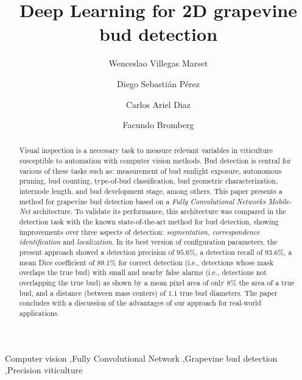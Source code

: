 \documentclass[a4paper,authoryear,review]{elsarticle}
\begin{document}
\begin{frontmatter}

\title{Deep Learning for 2D grapevine bud detection}

\author[utn]{Wenceslao Villegas Marset}

\author[utn]{Diego Sebastián Pérez}

\author[utn]{Carlos Ariel Diaz}

\author[utn,conicet]{Facundo Bromberg}

\address[utn]{Universidad Tecnológica Nacional, Facultad Regional Mendoza, Grupo de Inteligencia Artificial DHARMa, Dpto. de Sistemas de la Información. Rodríguez 273, CP 5500, Mendoza, Argentina.}

\address[conicet]{Consejo Nacional de Investigaciones Científicas y Técnicas (CONICET).}


\begin{abstract}
Visual inspection is a necessary task to measure relevant variables in viticulture susceptible to automation with computer vision methods. Bud detection is central for various of these tasks such as: measurement of bud sunlight exposure, autonomous pruning, bud counting, type-of-bud classification, bud geometric characterization, internode length, and bud development stage, among others. This paper presents a method for grapevine bud detection based on a \emph{Fully Convolutional Networks Mobile-Net} architecture. To validate its performance, this architecture was compared in the detection task with the known state-of-the-art method for bud detection, showing improvements over three aspects of detection: \emph{segmentation, correspondence identification} and \emph{localization}. In its best version of configuration parameters, the present approach showed a detection precision of $95.6\%$, a detection recall of $93.6\%$, a mean Dice coefficient of $89.1\%$ for correct detection (i.e., detections whose mask overlaps the true bud) with small and nearby false alarms (i.e., detections not overlapping the true bud) as shown by a mean pixel area of only $8\%$ the area of a true bud,  and a distance (between mass centers) of $1.1$ true bud diameters. The paper concludes with a discussion of the  advantages of our approach for real-world applications.
\end{abstract}

\begin{keyword}
Computer vision \sep Fully Convolutional Network \sep Grapevine bud detection \sep Precision viticulture
\end{keyword}
\end{frontmatter}
\end{document}
